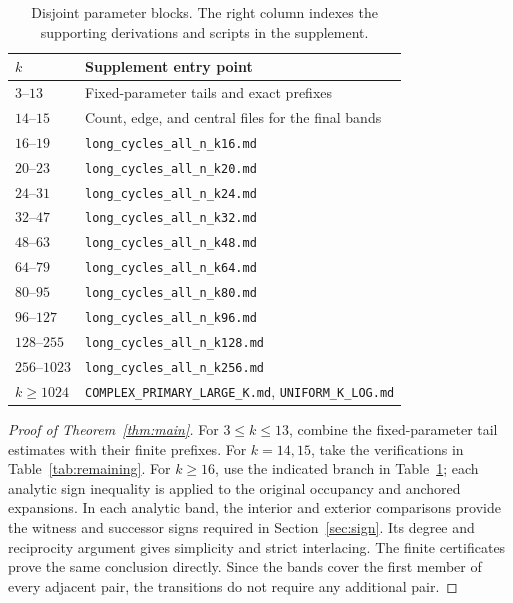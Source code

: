 \documentclass[11pt,reqno]{amsart}
\theoremstyle{remark}
\begin{document}
\begin{table}[t]
 \centering
 \caption{Disjoint parameter blocks. The right column indexes the supporting derivations and scripts in the supplement.}
 \label{tab:cover}
 \begin{tabular}{@{}ll@{}}
 \toprule
 $k$ & Supplement entry point \\
 \midrule
 $3$--$13$ & Fixed-parameter tails and exact prefixes \\
 $14$--$15$ & Count, edge, and central files for the final bands \\
 $16$--$19$ & \texttt{long\_cycles\_all\_n\_k16.md} \\
 $20$--$23$ & \texttt{long\_cycles\_all\_n\_k20.md} \\
 $24$--$31$ & \texttt{long\_cycles\_all\_n\_k24.md} \\
 $32$--$47$ & \texttt{long\_cycles\_all\_n\_k32.md} \\
 $48$--$63$ & \texttt{long\_cycles\_all\_n\_k48.md} \\
 $64$--$79$ & \texttt{long\_cycles\_all\_n\_k64.md} \\
 $80$--$95$ & \texttt{long\_cycles\_all\_n\_k80.md} \\
 $96$--$127$ & \texttt{long\_cycles\_all\_n\_k96.md} \\
 $128$--$255$ & \texttt{long\_cycles\_all\_n\_k128.md} \\
 $256$--$1023$ & \texttt{long\_cycles\_all\_n\_k256.md} \\
 $k\ge1024$ & \texttt{COMPLEX\_PRIMARY\_LARGE\_K.md}, \texttt{UNIFORM\_K\_LOG.md}\\
 \bottomrule
 \end{tabular}
\end{table}
\begin{proof}[Proof of Theorem~\ref{thm:main}]
For $3\le k\le13$, combine the fixed-parameter tail estimates with their finite prefixes. For $k=14,15$, take the verifications in Table~\ref{tab:remaining}. For $k\ge16$, use the indicated branch in Table~\ref{tab:cover}; each analytic sign inequality is applied to the original occupancy and anchored expansions. In each analytic band, the interior and exterior comparisons provide the witness and successor signs required in Section~\ref{sec:sign}. Its degree and reciprocity argument gives simplicity and strict interlacing. The finite certificates prove the same conclusion directly. Since the bands cover the first member of every adjacent pair, the transitions do not require any additional pair.
\end{proof}
\end{document}
